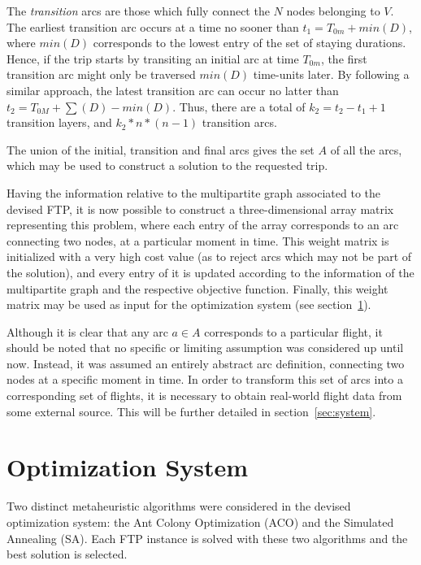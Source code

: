 \documentclass[onecolumn]{elsarticle}
\begin{document}
The \textit{transition} arcs are those which fully connect the $N$ nodes belonging to $V$. The earliest transition arc occurs at a time no sooner than $t_1 = T_{0m} + min(D)$, where $min(D)$ corresponds to the lowest entry of the set of staying durations. Hence, if the trip starts by transiting an initial arc at time $T_{0m}$, the first transition arc might only be traversed $min(D)$ time-units later. By following a similar approach, the latest transition arc can occur no latter than $t_2 = T_{0M} + \sum(D) - min(D)$. Thus, there are a total of $k_2 = t_2-t_1+1$ transition layers, and $k_2*n*(n-1)$ transition arcs.

The union of the initial, transition and final arcs gives the set $A$ of all the arcs, which may be used to construct a solution to the requested trip. 

Having the information relative to the multipartite graph associated to the devised FTP, it is now possible to construct a three-dimensional array matrix representing this problem, where each entry of the array corresponds to an arc connecting two nodes, at a particular moment in time. This weight matrix is initialized with a very high cost value (as to reject arcs which may not be part of the solution), and every entry of it is updated according to the information of the multipartite graph and the respective objective function. Finally, this weight matrix may be used as input for the optimization system (see section~\ref{sec:optimization}).

Although it is clear that any arc $a \in A$ corresponds to a particular flight, it should be noted that no specific or limiting assumption was considered up until now. Instead, it was assumed an entirely abstract arc definition, connecting two nodes at a specific moment in time. In order to transform this set of arcs into a corresponding set of flights, it is necessary to obtain real-world flight data from some external source. This will be further detailed in section~\ref{sec:system}.
\section{Optimization System}
\label{sec:optimization}

Two distinct metaheuristic algorithms were considered in the devised optimization system: the Ant Colony Optimization (ACO) and the Simulated Annealing (SA). Each FTP instance is solved with these two algorithms and the best solution is selected.
\end{document}

